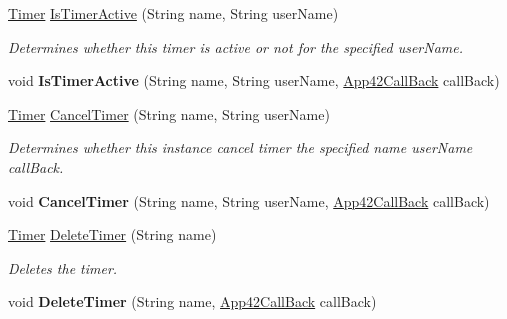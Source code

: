 \begin{DoxyCompactItemize}
\item 
\hyperlink{classcom_1_1shephertz_1_1app42_1_1paas_1_1sdk_1_1csharp_1_1timer_1_1_timer}{Timer} \hyperlink{classcom_1_1shephertz_1_1app42_1_1paas_1_1sdk_1_1csharp_1_1timer_1_1_timer_service_a543a26863be371dfcf3ec71de9abf2c7}{Is\+Timer\+Active} (String name, String user\+Name)
\begin{DoxyCompactList}\small\item\em Determines whether this timer is active or not for the specified user\+Name. \end{DoxyCompactList}\item 
\hypertarget{classcom_1_1shephertz_1_1app42_1_1paas_1_1sdk_1_1csharp_1_1timer_1_1_timer_service_ac9a325bd4b269ca79696be35b28c1576}{void {\bfseries Is\+Timer\+Active} (String name, String user\+Name, \hyperlink{interfacecom_1_1shephertz_1_1app42_1_1paas_1_1sdk_1_1csharp_1_1_app42_call_back}{App42\+Call\+Back} call\+Back)}\label{classcom_1_1shephertz_1_1app42_1_1paas_1_1sdk_1_1csharp_1_1timer_1_1_timer_service_ac9a325bd4b269ca79696be35b28c1576}

\item 
\hyperlink{classcom_1_1shephertz_1_1app42_1_1paas_1_1sdk_1_1csharp_1_1timer_1_1_timer}{Timer} \hyperlink{classcom_1_1shephertz_1_1app42_1_1paas_1_1sdk_1_1csharp_1_1timer_1_1_timer_service_ad64d0d505e725842d528940a210f9b9b}{Cancel\+Timer} (String name, String user\+Name)
\begin{DoxyCompactList}\small\item\em Determines whether this instance cancel timer the specified name user\+Name call\+Back. \end{DoxyCompactList}\item 
\hypertarget{classcom_1_1shephertz_1_1app42_1_1paas_1_1sdk_1_1csharp_1_1timer_1_1_timer_service_a82883e1e6068ba825f6c66c087c2ab0c}{void {\bfseries Cancel\+Timer} (String name, String user\+Name, \hyperlink{interfacecom_1_1shephertz_1_1app42_1_1paas_1_1sdk_1_1csharp_1_1_app42_call_back}{App42\+Call\+Back} call\+Back)}\label{classcom_1_1shephertz_1_1app42_1_1paas_1_1sdk_1_1csharp_1_1timer_1_1_timer_service_a82883e1e6068ba825f6c66c087c2ab0c}

\item 
\hyperlink{classcom_1_1shephertz_1_1app42_1_1paas_1_1sdk_1_1csharp_1_1timer_1_1_timer}{Timer} \hyperlink{classcom_1_1shephertz_1_1app42_1_1paas_1_1sdk_1_1csharp_1_1timer_1_1_timer_service_a5675afbdcae2b40b639ca7b859d85df6}{Delete\+Timer} (String name)
\begin{DoxyCompactList}\small\item\em Deletes the timer. \end{DoxyCompactList}\item 
\hypertarget{classcom_1_1shephertz_1_1app42_1_1paas_1_1sdk_1_1csharp_1_1timer_1_1_timer_service_a26ca2155d38405c81c77463c794c15e7}{void {\bfseries Delete\+Timer} (String name, \hyperlink{interfacecom_1_1shephertz_1_1app42_1_1paas_1_1sdk_1_1csharp_1_1_app42_call_back}{App42\+Call\+Back} call\+Back)}\label{classcom_1_1shephertz_1_1app42_1_1paas_1_1sdk_1_1csharp_1_1timer_1_1_timer_service_a26ca2155d38405c81c77463c794c15e7}


\end{DoxyCompactItemize}
